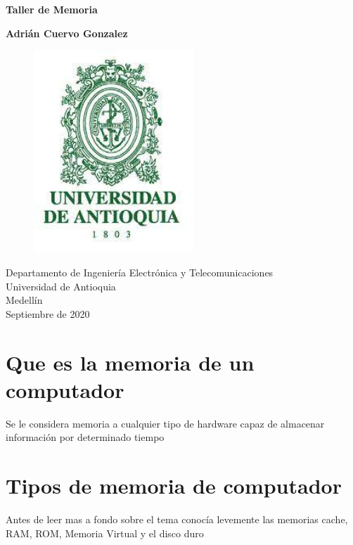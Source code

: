 \documentclass{article}
\begin{document}
	
	\begin{titlepage}
		\begin{center}
			\vspace*{1cm}
			
			\Huge
			\textbf{Taller de Memoria}
			
			\vspace{0.5cm}
			\LARGE
			
			\vspace{1.5cm}
			
			\textbf{Adrián Cuervo Gonzalez}
			\vfill
			\begin{figure}[h]
				\includegraphics[width=6cm]{Images/EscudoUdeA.jpg}
				\centering
				\label{fig:EscudoUdeA}
			\end{figure}
			
			\vspace{0.8cm}
			
			\Large
			Departamento de Ingeniería Electrónica y Telecomunicaciones\\
			Universidad de Antioquia\\
			Medellín\\
			Septiembre de 2020
			
		\end{center}
	\end{titlepage}
	
	\tableofcontents
	\newpage
	\section{Que es la memoria de un computador}\label{intro}
	Se le considera memoria a cualquier tipo de hardware capaz de almacenar información por determinado tiempo
	
	\section{Tipos de memoria de computador} \label{contenido}
	Antes de leer mas a fondo sobre el tema conocía levemente las memorias cache, RAM, ROM, Memoria Virtual y el disco duro
\end{document}
